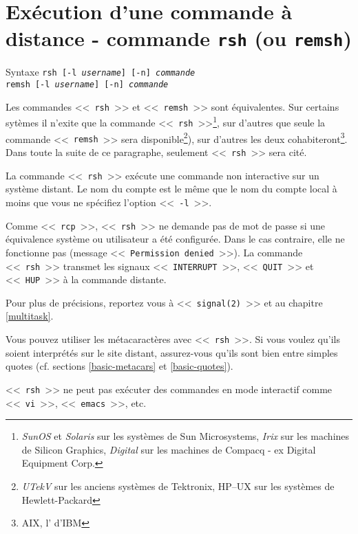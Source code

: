 \section{Ex{\'e}cution d'une commande {\`a} distance - commande {\tt rsh} (ou {\tt remsh})}

\begin{definition}{Syntaxe}
{\tt rsh [-l {\it username}] [-n] {\it commande}}\\
{\tt remsh [-l {\it username}] [-n] {\it commande}}
\end{definition}

Les commandes <<~\texttt{rsh}~>> et <<~\texttt{remsh}~>> sont {\'e}quivalentes.
Sur certains syt{\`e}mes il n'exite que la commande <<~\texttt{rsh}~>>\footnote{\textsl{SunOS} et  \textsl{Solaris} sur les syst{\`e}mes de Sun Microsystems, \textsl{Irix} sur les machines de Silicon Graphics, \textsl{Digital {\Unix}} sur les machines de Compacq - ex Digital Equipment Corp.}, sur d'autres que seule la commande <<~{\tt remsh}~>> sera disponible\footnote{\textsl{UTekV} sur les anciens syst{\`e}mes {\Unix} de Tektronix, \textsf{HP--UX} sur les syst{\`e}mes de Hewlett-Packard}), sur d'autres les deux cohabiteront\footnote{AIX, l'{\Unix} d'IBM}. Dans toute la suite de ce paragraphe, seulement <<~\texttt{rsh}~>> sera cit{\'e}.

La commande <<~{\tt rsh}~>> ex{\'e}cute une commande non interactive sur un syst{\`e}me distant. Le nom du compte est le m{\^e}me que le nom du compte local {\`a} moins que vous ne sp{\'e}cifiez l'option <<~{\tt -l}~>>.

Comme <<~{\tt rcp}~>>, <<~{\tt rsh}~>> ne demande pas de mot de passe si une {\'e}quivalence syst{\`e}me ou utilisateur a {\'e}t{\'e} configur{\'e}e. Dans le cas contraire, elle ne fonctionne pas (message <<~{\tt Permission denied}~>>). La commande <<~{\tt rsh}~>> transmet les signaux <<~{\tt INTERRUPT}~>>, <<~{\tt QUIT}~>> et <<~{\tt HUP}~>> {\`a} la commande distante.

Pour plus de pr{\'e}cisions, reportez vous {\`a} <<~{\tt signal(2)}~>> et au chapitre \ref{multitask}.

Vous pouvez utiliser les m{\'e}tacaract{\`e}res avec <<~{\tt rsh}~>>. Si vous voulez qu'ils soient interpr{\'e}t{\'e}s sur le site distant, assurez-vous qu'ils sont bien entre simples quotes (cf. sections \ref{basic-metacars} et \ref{basic-quotes}).

\begin{remarque}
<<~{\tt rsh}~>> ne peut pas ex{\'e}cuter des commandes en mode interactif comme
<<~{\tt vi}~>>, <<~{\tt emacs}~>>, etc.
\end{remarque}

